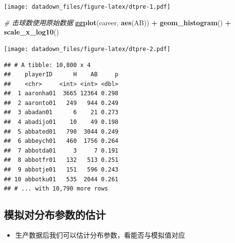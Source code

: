\documentclass[]{book}
\newenvironment{Shaded}{\begin{snugshade}}{\end{snugshade}}
\newcommand{\CommentTok}[1]{\textcolor[rgb]{0.56,0.35,0.01}{\textit{#1}}}
\newcommand{\DataTypeTok}[1]{\textcolor[rgb]{0.13,0.29,0.53}{#1}}
\newcommand{\DecValTok}[1]{\textcolor[rgb]{0.00,0.00,0.81}{#1}}
\newcommand{\KeywordTok}[1]{\textcolor[rgb]{0.13,0.29,0.53}{\textbf{#1}}}
\newcommand{\NormalTok}[1]{#1}
\newcommand{\OperatorTok}[1]{\textcolor[rgb]{0.81,0.36,0.00}{\textbf{#1}}}
\newcommand{\StringTok}[1]{\textcolor[rgb]{0.31,0.60,0.02}{#1}}
\providecommand{\tightlist}{%
  \setlength{\itemsep}{0pt}\setlength{\parskip}{0pt}}
\begin{document}
\texttt{[image: datadown\_files/figure-latex/dtpre-1.pdf]}

\begin{Shaded}
\begin{Highlighting}[]
\CommentTok{# 击球数使用原始数据}
\KeywordTok{ggplot}\NormalTok{(career, }\KeywordTok{aes}\NormalTok{(AB)) }\OperatorTok{+}
\StringTok{  }\KeywordTok{geom_histogram}\NormalTok{() }\OperatorTok{+}
\StringTok{  }\KeywordTok{scale_x_log10}\NormalTok{()}
\end{Highlighting}
\end{Shaded}

\texttt{[image: datadown\_files/figure-latex/dtpre-2.pdf]}

\begin{Shaded}
\end{Shaded}

\begin{verbatim}
## # A tibble: 10,800 x 4
##    playerID      H    AB     p
##    <chr>     <int> <int> <dbl>
##  1 aaronha01  3665 12364 0.298
##  2 aaronto01   249   944 0.249
##  3 abadan01      6    21 0.273
##  4 abadijo01    10    49 0.198
##  5 abbated01   790  3044 0.249
##  6 abbeych01   460  1756 0.264
##  7 abbotda01     3     7 0.191
##  8 abbotfr01   132   513 0.251
##  9 abbotje01   151   596 0.243
## 10 abbotku01   535  2044 0.261
## # ... with 10,790 more rows
\end{verbatim}

\hypertarget{ux6a21ux62dfux5bf9ux5206ux5e03ux53c2ux6570ux7684ux4f30ux8ba1}{%
\subsection{模拟对分布参数的估计}\label{ux6a21ux62dfux5bf9ux5206ux5e03ux53c2ux6570ux7684ux4f30ux8ba1}}

\begin{itemize}
\tightlist
\item
  生产数据后我们可以估计分布参数，看能否与模拟值对应
\end{itemize}
\end{document}
